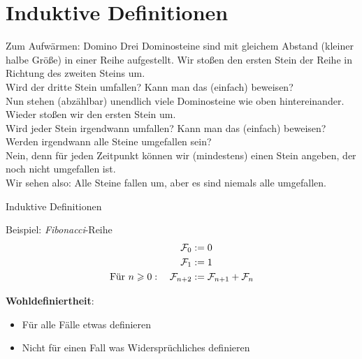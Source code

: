 \section{Induktive Definitionen}

\begin{frame}{Zum Aufwärmen: Domino}
	Drei Dominosteine sind mit gleichem Abstand (kleiner halbe Größe) in einer Reihe aufgestellt. Wir stoßen den ersten Stein der Reihe in Richtung des zweiten Steins um. \\
	Wird der dritte Stein umfallen? Kann man das (einfach) beweisen? \\[1em]
	\pause
	Nun stehen (abzählbar) unendlich viele Dominosteine wie oben hintereinander. Wieder stoßen wir den ersten Stein um. \\
	Wird jeder Stein irgendwann umfallen? Kann man das (einfach) beweisen? \\[1em]
	\pause
	Werden irgendwann alle Steine umgefallen sein? \\
	\pause Nein, denn für jeden Zeitpunkt können wir (mindestens) einen Stein angeben, der noch nicht umgefallen ist.\\
	Wir sehen also: Alle Steine fallen um, aber es sind niemals alle umgefallen.
\end{frame}

\newcommand{\Fib}{\mathcal{F}\hspace{-1pt}}

\begin{frame}{Induktive Definitionen}
	\begin{exampleblock}{Beispiel: \emph{Fibonacci}-Reihe}
		\begin{align*}
		\Fib_0 &:= 0 \\
		\Fib_1 &:= 1 \\
		\text{Für } n \geq 0: \quad \Fib_{n+2} &:= \Fib_{n+1} + \Fib_n 		
		\end{align*}
		\pause
		\vspace{-\baselineskip}
		
		\pause
		\textbf{Wohldefiniertheit}: 
		\begin{itemize}
			\item Für alle Fälle etwas definieren 
			\item Nicht für einen Fall was Widersprüchliches definieren
		\end{itemize}
		
	\end{exampleblock}
	
\end{frame}


